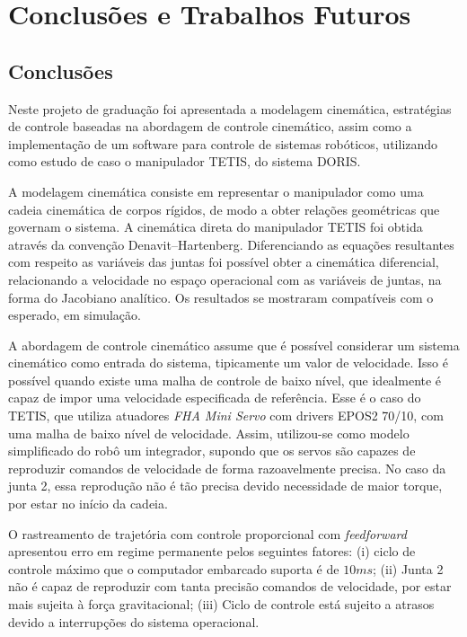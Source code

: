 \chapter{Conclusões e Trabalhos Futuros}

\section{Conclusões}

Neste projeto de graduação foi apresentada a modelagem cinemática, estratégias de controle baseadas na abordagem de controle cinemático, assim como a implementação de um software para controle de sistemas robóticos, utilizando como estudo de caso o manipulador TETIS, do sistema DORIS. 

A modelagem cinemática consiste em representar o manipulador como uma cadeia cinemática de corpos rígidos, de modo a obter relações geométricas que governam o sistema. A cinemática direta do manipulador TETIS foi obtida através da convenção Denavit–Hartenberg. Diferenciando as equações resultantes com respeito as variáveis das juntas foi possível obter a cinemática diferencial, relacionando a velocidade no espaço operacional com as variáveis de juntas, na forma do Jacobiano analítico. Os resultados se mostraram compatíveis com o esperado, em simulação. 

A abordagem de controle cinemático assume que é possível considerar um sistema cinemático como entrada do sistema, tipicamente um valor de velocidade. Isso é possível quando existe uma malha de controle de baixo nível, que idealmente é capaz de impor uma velocidade especificada de referência. Esse é o caso do TETIS, que utiliza atuadores \textit{FHA Mini Servo} com drivers EPOS2 70/10, com uma malha de baixo nível de velocidade. Assim, utilizou-se como modelo simplificado do robô um integrador, supondo que os servos são capazes de reproduzir comandos de velocidade de forma razoavelmente precisa. No caso da junta 2, essa reprodução não é tão precisa devido necessidade de maior torque, por estar no início da cadeia.

O rastreamento de trajetória com controle proporcional com \textit{feedforward} apresentou erro em regime permanente pelos seguintes fatores: (i) ciclo de controle máximo que o computador embarcado suporta é de $10ms$; (ii) Junta 2 não é capaz de reproduzir com tanta precisão comandos de velocidade, por estar mais sujeita à força gravitacional; (iii) Ciclo de controle está sujeito a atrasos devido a interrupções do sistema operacional. 

